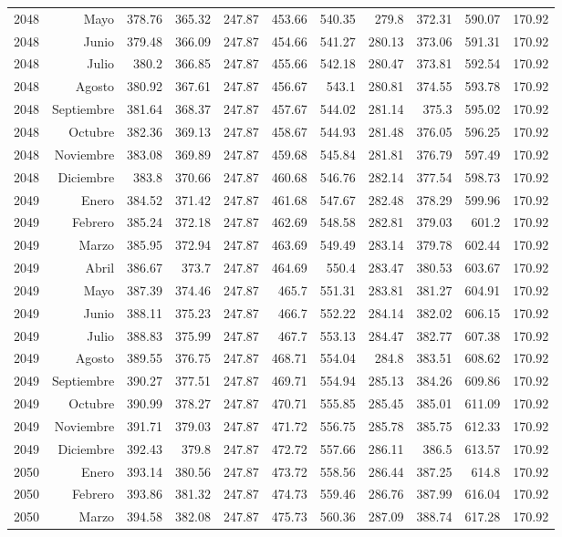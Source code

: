\documentclass{article}%
\begin{document}
\begin{longtable}{|l r|r|r|r|r|r|r|r|r|r|}
2048&Mayo&378.76&365.32&247.87&453.66&540.35&279.8&372.31&590.07&170.92\\%
2048&Junio&379.48&366.09&247.87&454.66&541.27&280.13&373.06&591.31&170.92\\%
2048&Julio&380.2&366.85&247.87&455.66&542.18&280.47&373.81&592.54&170.92\\%
2048&Agosto&380.92&367.61&247.87&456.67&543.1&280.81&374.55&593.78&170.92\\%
2048&Septiembre&381.64&368.37&247.87&457.67&544.02&281.14&375.3&595.02&170.92\\%
2048&Octubre&382.36&369.13&247.87&458.67&544.93&281.48&376.05&596.25&170.92\\%
2048&Noviembre&383.08&369.89&247.87&459.68&545.84&281.81&376.79&597.49&170.92\\%
2048&Diciembre&383.8&370.66&247.87&460.68&546.76&282.14&377.54&598.73&170.92\\%
2049&Enero&384.52&371.42&247.87&461.68&547.67&282.48&378.29&599.96&170.92\\%
2049&Febrero&385.24&372.18&247.87&462.69&548.58&282.81&379.03&601.2&170.92\\%
2049&Marzo&385.95&372.94&247.87&463.69&549.49&283.14&379.78&602.44&170.92\\%
2049&Abril&386.67&373.7&247.87&464.69&550.4&283.47&380.53&603.67&170.92\\%
2049&Mayo&387.39&374.46&247.87&465.7&551.31&283.81&381.27&604.91&170.92\\%
2049&Junio&388.11&375.23&247.87&466.7&552.22&284.14&382.02&606.15&170.92\\%
2049&Julio&388.83&375.99&247.87&467.7&553.13&284.47&382.77&607.38&170.92\\%
2049&Agosto&389.55&376.75&247.87&468.71&554.04&284.8&383.51&608.62&170.92\\%
2049&Septiembre&390.27&377.51&247.87&469.71&554.94&285.13&384.26&609.86&170.92\\%
2049&Octubre&390.99&378.27&247.87&470.71&555.85&285.45&385.01&611.09&170.92\\%
2049&Noviembre&391.71&379.03&247.87&471.72&556.75&285.78&385.75&612.33&170.92\\%
2049&Diciembre&392.43&379.8&247.87&472.72&557.66&286.11&386.5&613.57&170.92\\%
2050&Enero&393.14&380.56&247.87&473.72&558.56&286.44&387.25&614.8&170.92\\%
2050&Febrero&393.86&381.32&247.87&474.73&559.46&286.76&387.99&616.04&170.92\\%
2050&Marzo&394.58&382.08&247.87&475.73&560.36&287.09&388.74&617.28&170.92\\%

\end{longtable}
\end{document}
